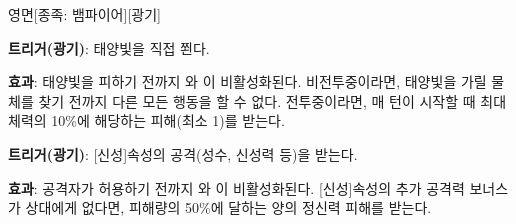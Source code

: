 \documentclass{report}
\begin{document}
	\begin{story}{영면}{[종족: 뱀파이어][광기]}
		
		\textbf{트리거(광기)}: 태양빛을 직접 쬔다.
		
		\textbf{효과}: 태양빛을 피하기 전까지 와 이 비활성화된다. 비전투중이라면, 태양빛을 가릴 물체를 찾기 전까지 다른 모든 행동을 할 수 없다. 전투중이라면, 매 턴이 시작할 때 최대체력의 10\%에 해당하는 피해(최소 1)를 받는다.
		
		\smallskip
		
		\textbf{트리거(광기)}: [신성]속성의 공격(성수, 신성력 등)을 받는다.
		
		\textbf{효과}: 공격자가 허용하기 전까지 와 이 비활성화된다. [신성]속성의 추가 공격력 보너스가 상대에게 없다면, 피해량의 50\%에 달하는 양의 정신력 피해를 받는다.
		
		\smallskip
		
	\end{story}
	
\end{document}
